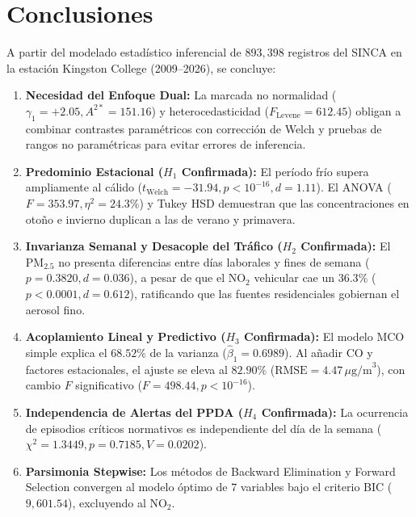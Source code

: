 \documentclass[10pt,twocolumn,a4paper]{article}
\begin{document}
\section{Conclusiones}

A partir del modelado estadístico inferencial de $893,398$ registros del SINCA en la estación Kingston College (2009--2026), se concluye:
\begin{enumerate}
    \item \textbf{Necesidad del Enfoque Dual:} La marcada no normalidad ($\gamma_1 = +2.05, A^{2*} = 151.16$) y heterocedasticidad ($F_{\text{Levene}} = 612.45$) obligan a combinar contrastes paramétricos con corrección de Welch y pruebas de rangos no paramétricas para evitar errores de inferencia.
    \item \textbf{Predominio Estacional ($H_1$ Confirmada):} El período frío supera ampliamente al cálido ($t_{\text{Welch}} = -31.94, p < 10^{-16}, d = 1.11$). El ANOVA ($F = 353.97, \eta^2 = 24.3\%$) y Tukey HSD demuestran que las concentraciones en otoño e invierno duplican a las de verano y primavera.
    \item \textbf{Invarianza Semanal y Desacople del Tráfico ($H_2$ Confirmada):} El $\text{PM}_{2.5}$ no presenta diferencias entre días laborales y fines de semana ($p = 0.3820, d = 0.036$), a pesar de que el $\text{NO}_2$ vehicular cae un $36.3\%$ ($p < 0.0001, d = 0.612$), ratificando que las fuentes residenciales gobiernan el aerosol fino.
    \item \textbf{Acoplamiento Lineal y Predictivo ($H_3$ Confirmada):} El modelo MCO simple explica el $68.52\%$ de la varianza ($\hat{\beta}_1 = 0.6989$). Al añadir $\text{CO}$ y factores estacionales, el ajuste se eleva al $82.90\%$ ($\text{RMSE} = 4.47\,\mu\text{g/m}^3$), con cambio $F$ significativo ($F = 498.44, p < 10^{-16}$).
    \item \textbf{Independencia de Alertas del PPDA ($H_4$ Confirmada):} La ocurrencia de episodios críticos normativos es independiente del día de la semana ($\chi^2 = 1.3449, p = 0.7185, V = 0.0202$).
    \item \textbf{Parsimonia Stepwise:} Los métodos de Backward Elimination y Forward Selection convergen al modelo óptimo de $7$ variables bajo el criterio BIC ($9,601.54$), excluyendo al $\text{NO}_2$.
\end{enumerate}
\end{document}
